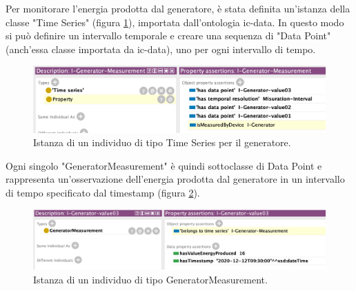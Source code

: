 Per monitorare l'energia prodotta dal generatore, è stata definita un'istanza della classe "Time Series" (figura \ref{fig:individual_genmeas}), importata dall'ontologia ic-data. In questo modo si può definire un intervallo temporale e creare una sequenza di "Data Point"(anch'essa classe importata da ic-data), uno per ogni intervallo di tempo.
\begin{figure}[H]
    \centering
    \includegraphics[width=12cm]{images/individual_genmeas.png}
    \caption{Istanza di un individuo di tipo Time Series per il generatore.}
    \label{fig:individual_genmeas}
\end{figure}
Ogni singolo "GeneratorMeasurement" è quindi sottoclasse di Data Point e rappresenta un'osservazione dell'energia prodotta dal generatore in un intervallo di tempo specificato dal timestamp (figura \ref{fig:individual_genval3}).
\begin{figure}[H]
    \centering
    \includegraphics[width=12cm]{images/individual_genval3.png}
    \caption{Istanza di un individuo di tipo GeneratorMeasurement.}
    \label{fig:individual_genval3}
\end{figure}


